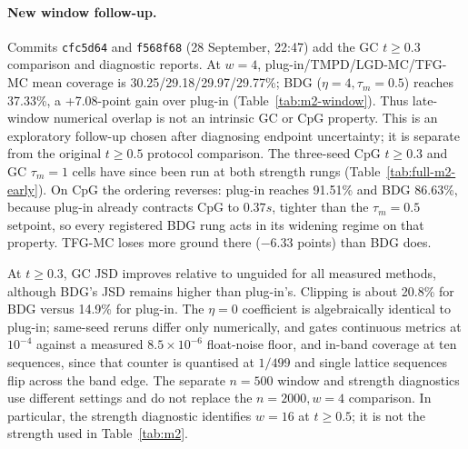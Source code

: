 \documentclass{article}
\begin{document}
\paragraph{New window follow-up.} Commits \texttt{cfc5d64} and \texttt{f568f68} (28 September, 22:47) add the GC $t\ge0.3$ comparison and diagnostic reports. At $w=4$, plug-in/TMPD/LGD-MC/TFG-MC mean coverage is 30.25/29.18/29.97/29.77\%; BDG ($\eta=4,\tau_m=0.5$) reaches 37.33\%, a +7.08-point gain over plug-in (Table~\ref{tab:m2-window}). Thus late-window numerical overlap is not an intrinsic GC or CpG property. This is an exploratory follow-up chosen after diagnosing endpoint uncertainty; it is separate from the original $t\ge0.5$ protocol comparison. The three-seed CpG $t\ge0.3$ and GC $\tau_m=1$ cells have since been run at both strength rungs (Table~\ref{tab:full-m2-early}). On CpG the ordering reverses: plug-in reaches 91.51\% and BDG 86.63\%, because plug-in already contracts CpG to $0.37s$, tighter than the $\tau_m=0.5$ setpoint, so every registered BDG rung acts in its widening regime on that property. TFG-MC loses more ground there ($-6.33$ points) than BDG does.

At $t\ge0.3$, GC JSD improves relative to unguided for all measured methods, although BDG's JSD remains higher than plug-in's. Clipping is about 20.8\% for BDG versus 14.9\% for plug-in. The $\eta=0$ coefficient is algebraically identical to plug-in; same-seed reruns differ only numerically, and  gates continuous metrics at $10^{-4}$ against a measured $8.5\times10^{-6}$ float-noise floor, and in-band coverage at ten sequences, since that counter is quantised at $1/499$ and single lattice sequences flip across the band edge. The separate $n=500$ window and strength diagnostics use different settings and do not replace the $n=2000,w=4$ comparison. In particular, the strength diagnostic identifies $w=16$ at $t\ge0.5$; it is not the strength used in Table~\ref{tab:m2}.
\end{document}
